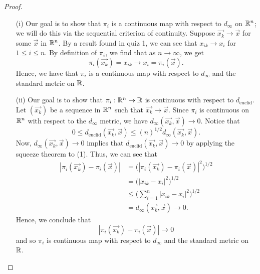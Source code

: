 \documentclass[a4paper]{article}
\begin{document}
\begin{proof}
\begin{enumerate}
    \item[(i)] Our goal is to show that \( {\pi}_{i} \) is a continuous map with respect to \( {d}_{\infty } \) on \( \mathbb{R}^{n} \); we will do this via the sequential criterion of continuity. Suppose \( \vec{ {x}_{k} }  \to \vec{ x }  \) for some \( \vec{ x }  \) in \( \mathbb{R}^{n} \). By a result found in quiz 1, we can see that \( {x}_{ik} \to {x}_{i} \) for \( 1 \leq i \leq n  \). By definition of \( {\pi}_{i} \), we find that as \( n \to \infty  \), we get
        \[ {\pi}_{i}(\vec{ x_{k} } ) = {x}_{ik} \to {x}_{i} = {\pi}_{i}(\vec{ x } ).  \]
        Hence, we have that \( {\pi}_{i} \) is a continuous map with respect to \( {d}_{\infty } \) and the standard metric on \( \mathbb{R}  \).
    \item[(ii)] Our goal is to show that \( {\pi}_{i}: \mathbb{R}^{n} \to \mathbb{R}  \) is continuous with respect to \( {d}_{\text{euclid}}  \). Let \( (\vec{ {x}_{k} } )\) be a sequence in \( \mathbb{R}^{n} \) such that \( \vec{ {x}_{k} } \to \vec{ x }    \). Since \( {\pi}_{i} \) is continuous on \( \mathbb{R}^{n} \) with respect to the \( {d}_{\infty }  \) metric, we have \( {d}_{\infty }(\vec{ {x}_{k} }, \vec{ x } ) \to 0 \). Notice that 
        \[  0 \leq {d}_{\text{euclid}}(\vec{ {x}_{k} } , \vec{ x } ) \leq (n)^{1/2} {d}_{\infty }(\vec{ {x}_{k} } , \vec{ x } ). \tag{1} \]
        Now, \( {d}_{\infty }(\vec{ {x}_{k}}, \vec{ x }  ) \to 0  \) implies that \( {d}_{\text{euclid}}(\vec{ {x}_{k} } , \vec{ x } ) \to 0  \) by applying the squeeze theorem to (1). Thus, we can see that  
        \begin{align*}
            | {\pi}_{i}(\vec{ {x}_{k} } ) - {\pi }_{i}(\vec{ x } )  | &= \Big( | {\pi}_{i}(\vec{ {x}_{k} } ) - {\pi}_{i}( \vec{ x }  ) |^{2} \Big)^{1/2}  \\
                                                                      &= \Big( | {x}_{ik} - {x}_{i} |^{2}  \Big)^{1/2} \\
                                                                      &\leq \Big( \sum_{ i=1 }^{ n} | {x}_{ik } - {x}_{i} |^{2} \Big)^{1/2} \\
                                                                      &= {d}_{\infty }(\vec{ {x}_{k} } , \vec{ x } ) \to 0. 
        \end{align*}
        Hence, we conclude that 
        \[   | {\pi}_{i}(\vec{ {x}_{k} } ) - {\pi }_{i}(\vec{ x } )  | \to 0 \]
        and so \( {\pi}_{i} \) is continuous map with respect to \( {d}_{\infty } \) and the standard metric on \( \mathbb{R}  \).
\end{enumerate}
\end{proof}
\end{document}
